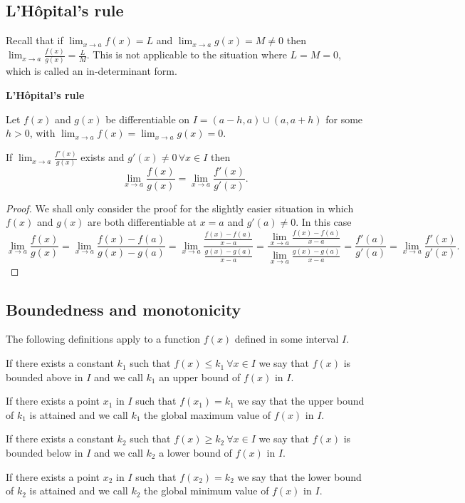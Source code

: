 \documentclass[10pt, a4paper]{article}
\begin{document}
\subsection{L'H\^opital's rule}
Recall that if $\lim_{x \rightarrow a}f(x) = L$ and $\lim_{x \rightarrow a}g(x) = M \neq 0$ then $\lim_{x \rightarrow a}\frac{f(x)}{g(x)} = \frac{L}{M}$. This is not applicable to the situation where $L = M = 0$, which is called an in-determinant form.

\textbf{L'H\^opital's rule}

Let $f(x)$ and $g(x)$ be differentiable on $I = (a - h, a) \cup (a, a + h)$ for some $h > 0$, with $\lim_{x \rightarrow a}f(x) = \lim_{x \rightarrow a}g(x) = 0$.

If $\lim_{x \rightarrow a}\frac{f'(x)}{g(x)}$ exists and $g'(x) \neq 0\, \forall x \in I$ then
\[
\lim_{x \rightarrow a}\frac{f(x)}{g(x)} = \lim_{x \rightarrow a}\frac{f'(x)}{g'(x)}.
\]
\begin{proof}
    We shall only consider the proof for the slightly easier situation in which $f(x)$ and $g(x)$ are both differentiable at $x = a$ and $g'(a) \neq 0$. In this case
    \[
    \lim_{x \rightarrow a}\frac{f(x)}{g(x)} = \lim_{x \rightarrow a}\frac{f(x) - f(a)}{g(x) - g(a)} = \lim_{x \rightarrow a}\frac{\frac{f(x) - f(a)}{x - a}}{\frac{g(x) - g(a)}{x - a}} = \frac{\lim_{x \rightarrow a}\frac{f(x) - f(a)}{x - a}}{\lim_{x \rightarrow a}\frac{g(x) - g(a)}{x - a}} = \frac{f'(a)}{g'(a)} = \lim_{x \rightarrow a}\frac{f'(x)}{g'(x)}.
    \]
\end{proof}


\subsection{Boundedness and monotonicity}
The following definitions apply to a function $f(x)$ defined in some interval $I$.

\begin{definition}
    If there exists a constant $k_1$ such that $f(x) \leq k_1\ \forall x \in I$ we say that $f(x)$ is bounded above in $I$ and we call $k_1$ an upper bound of $f(x)$ in $I$.

    If there exists a point $x_1$ in $I$ such that $f(x_1) = k_1$ we say that the upper bound of $k_1$ is attained and we call $k_1$ the global maximum value of $f(x)$ in $I$.
\end{definition}

\begin{definition}
    If there exists a constant $k_2$ such that $f(x) \geq k_2\ \forall x \in I$ we say that $f(x)$ is bounded below in $I$ and we call $k_2$ a lower bound of $f(x)$ in $I$.

    If there exists a point $x_2$ in $I$ such that $f(x_2) = k_2$ we say that the lower bound of $k_2$ is attained and we call $k_2$ the global minimum value of $f(x)$ in $I$.
\end{definition}
\end{document}
